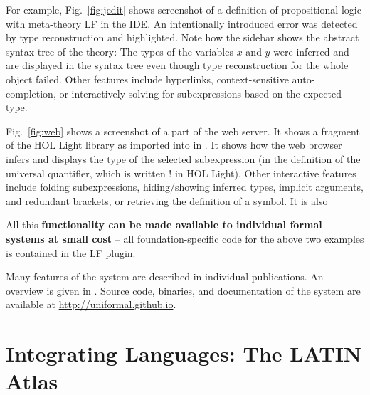For example, Fig.~\ref{fig:jedit} shows screenshot of a definition of propositional logic with meta-theory LF in the \mmt IDE.
An intentionally introduced error was detected by type reconstruction and highlighted.
Note how the sidebar shows the abstract syntax tree of the theory: The types of the variables $x$ and $y$ were inferred and are displayed in the syntax tree even though type reconstruction for the whole object failed.
Other features include hyperlinks, context-sensitive auto-completion, or interactively solving for subexpressions based on the expected type.

Fig.~\ref{fig:web} shows a screenshot of a part of the {\mmt} web server.
It shows a fragment of the HOL Light library as imported into \mmt in \cite{KR:hollight:14}.
It shows how the web browser infers and displays the type of the selected subexpression (in the definition of the universal quantifier, which is written $!$ in HOL Light).
Other interactive features include folding subexpressions, hiding/showing inferred types, implicit arguments, and redundant brackets, or retrieving the definition of a symbol.
It is also 

All this \textbf{functionality can be made available to individual formal systems at small cost} -- all foundation-specific code for the above two examples is contained in the LF plugin.
\medskip

Many features of the \mmt system are described in individual publications.
An overview is given in \cite{rabe:mmtabs:13}.
Source code, binaries, and documentation of the \mmt system are available at \url{http://uniformal.github.io}.

\section{Integrating Languages: The LATIN Atlas}\label{sec:atlas}

